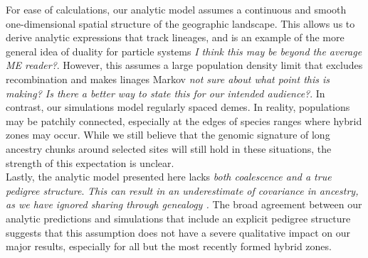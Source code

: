 \documentclass[11pt,letterpaper]{article}
\newcommand{\alisa}[1]{{\em \color{red} #1}}
\newcommand{\yb}[1]{{\em \color{magenta} #1}}
\begin{document}
For ease of calculations, our analytic model assumes a continuous and smooth one-dimensional spatial structure of the geographic landscape. This allows us to derive analytic expressions that track lineages, and is an example of the more general idea of duality for particle systems \alisa{I think this may be beyond the average ME reader?}. However, this assumes a large population density limit that excludes recombination and makes linages Markov \alisa{not sure about what point this is making? Is there a better way to state this for our intended audience?}.  In contrast, our simulations model regularly spaced demes. In reality, populations may be patchily connected, especially at the edges of species ranges where hybrid zones may occur. While we still believe that the genomic signature of long ancestry chunks around selected sites will still hold in these situations, the strength of this expectation is unclear.\\

Lastly, the analytic model presented here lacks \yb{both coalescence and a true pedigree structure}. \alisa{This can result in an underestimate of covariance in ancestry, as we have ignored sharing through genealogy \cite{Liang2014}.} 
The broad agreement between our analytic predictions and simulations that include an explicit pedigree structure suggests that this assumption does not have a severe qualitative impact on our major results, especially for all but the most recently formed hybrid zones.





\end{document}
